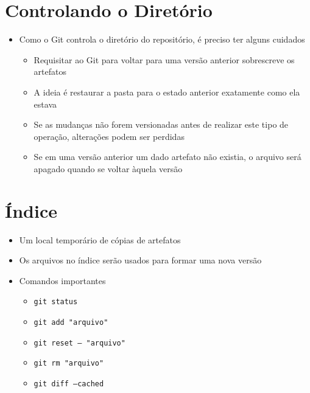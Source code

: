\documentclass{beamer}
\newenvironment{slide}{\begin{frame}{\insertsection}}{\end{frame}}
\begin{document}
\section{Controlando o Diretório}
\begin{slide}
    \begin{itemize}
        \item Como o Git controla o diretório do repositório, é preciso ter
            alguns cuidados
        \begin{itemize}
            \pause
            \item Requisitar ao Git para voltar para uma versão anterior
                sobrescreve os artefatos
            \pause
            \item A ideia é restaurar a pasta para o estado anterior exatamente
                como ela estava
            \pause
            \item Se as mudanças não forem versionadas antes de realizar este
                tipo de operação, alterações podem ser perdidas
            \pause
            \item Se em uma versão anterior um dado artefato não existia, o
                arquivo será apagado quando se voltar àquela versão
        \end{itemize}
    \end{itemize}
\end{slide}

\section{Índice}
\begin{slide}
    \begin{itemize}
        \item Um local temporário de cópias de artefatos
        \pause
        \item Os arquivos no índice serão usados para formar uma nova versão
        \pause
        \item Comandos importantes
        \begin{itemize}
            \pause
            \item \texttt{git status}
            \pause
            \item \texttt{git add "arquivo"}
            \pause
            \item \texttt{git reset -- "arquivo"}
            \pause
            \item \texttt{git rm "arquivo"}
            \pause
            \item \texttt{git diff --cached}
        \end{itemize}
    \end{itemize}
\end{slide}
\end{document}
